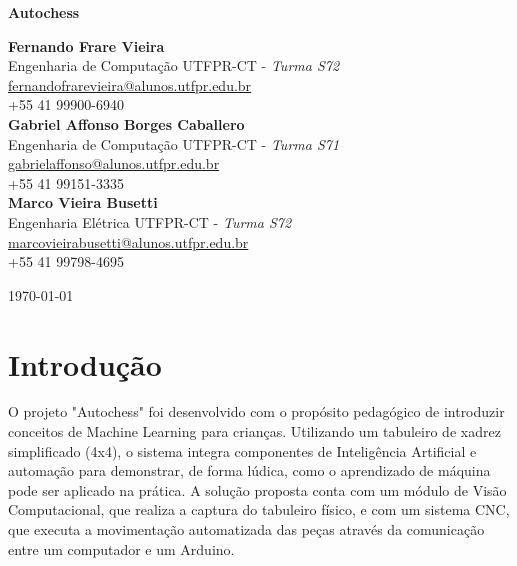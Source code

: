 \documentclass[a4paper,12pt]{article}
\date{\today}
\begin{document}
  

\vspace{1em}  
\begin{center}  
    \Large\textbf{Autochess}  
\end{center}  

\vspace{1em}  

\begin{center}  
    \textbf{Fernando Frare Vieira} \\
	Engenharia de Computação UTFPR-CT - \textit{Turma S72}\\
    \href{mailto:fernandofrarevieira@alunos.utfpr.edu.br}{fernandofrarevieira@alunos.utfpr.edu.br} \\  
    +55 41 99900-6940 \\[1.5em]  
    \textbf{Gabriel Affonso Borges Caballero} \\ 
	Engenharia de Computação UTFPR-CT - \textit{Turma S71}\\
    \href{mailto:gabrielaffonso@alunos.utfpr.edu.br}{gabrielaffonso@alunos.utfpr.edu.br} \\  
    +55 41 99151-3335\\[1.5em]  
    \textbf{Marco Vieira Busetti} \\ 
	Engenharia Elétrica UTFPR-CT - \textit{Turma S72}\\
    \href{mailto:marcovieirabusetti@alunos.utfpr.edu.br}{marcovieirabusetti@alunos.utfpr.edu.br} \\  
    +55 41 99798-4695  
\end{center}  

\vspace{1em}  
\begin{center}  
    \today  
\end{center}  
\vspace{2em}  

\section{Introdução}  
O projeto "Autochess" \; foi desenvolvido com o propósito pedagógico de introduzir conceitos de Machine Learning para crianças. Utilizando um tabuleiro de xadrez simplificado (4x4), o sistema integra componentes de Inteligência Artificial e automação para demonstrar, de forma lúdica, como o aprendizado de máquina pode ser aplicado na prática. A solução proposta conta com um módulo de Visão Computacional, que realiza a captura do tabuleiro físico, e com um sistema CNC, que executa a movimentação automatizada das peças através da comunicação entre um computador e um Arduino.  
\end{document}
